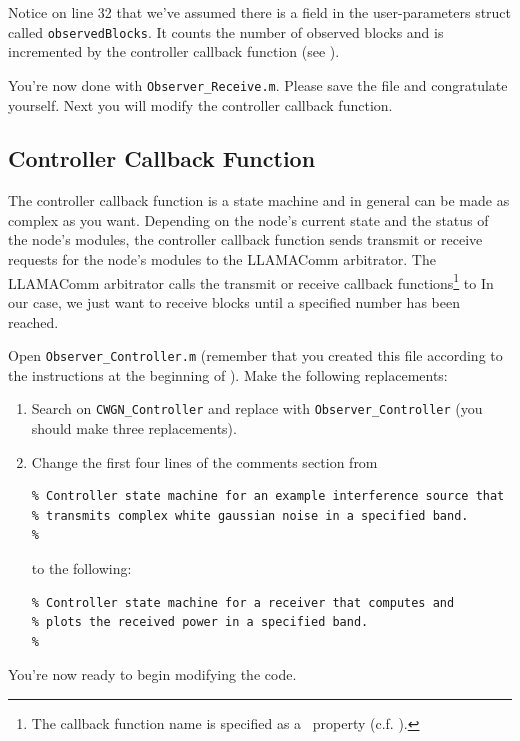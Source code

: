 Notice on line 32 that we've assumed there is a field in the user-parameters struct called \verb+observedBlocks+.  It counts the number of observed blocks and is incremented by the controller callback function (see ).

You're now done with \verb+Observer_Receive.m+.  Please save the file and congratulate yourself.  Next you will modify the controller callback function.


\subsection{Controller Callback Function}
\label{sec:observer_controller}

The controller callback function is a state machine and in general can be made as complex as you want.  Depending on the node's current state and the status of the node's modules, the controller callback function sends transmit or receive requests for the node's modules to the LLAMAComm arbitrator. The LLAMAComm arbitrator calls the transmit or receive callback functions\footnote{The callback function name is specified as a \module\ property (c.f. ).} to In our case, we just want to receive blocks until a specified number has been reached.

Open \verb+Observer_Controller.m+ (remember that you created this file according to the instructions at the beginning of ).  Make the following replacements:
\begin{enumerate}
\item Search on \verb+CWGN_Controller+ and replace with \verb+Observer_Controller+ (you should make three replacements).

\item Change the first four lines of the comments section from
%
\begin{lstlisting}[numbers=none]
% Function user_code/Observer_Controller.m:
% Controller state machine for an example interference source that
% transmits complex white gaussian noise in a specified band.
%
\end{lstlisting}
%
to the following:
%
\begin{lstlisting}[numbers=none]
% Function user_code/Observer_Controller.m:
% Controller state machine for a receiver that computes and
% plots the received power in a specified band.
%
\end{lstlisting}
%
\end{enumerate}
You're now ready to begin modifying the code.

